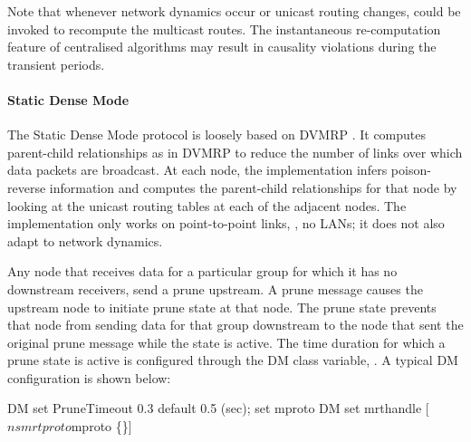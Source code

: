Note that whenever network dynamics occur or unicast routing changes,
 could be invoked to recompute the multicast routes.
The instantaneous re-computation feature of centralised algorithms
may result in causality violations during the transient
periods.

\paragraph{Static Dense Mode}
The Static Dense Mode protocol is loosely based on DVMRP \cite{rfc1075}.
It computes parent-child relationships as in DVMRP
to reduce the number of links over which data packets are broadcast.
At each node,
the implementation
 infers poison-reverse information
and
 computes the parent-child relationships 
 for that node by looking
at the unicast routing tables at each of the adjacent nodes.
The implementation only works on point-to-point links, \ie, no LANs;
it does not also adapt to network dynamics.

Any node that receives data for a particular group for which
it has no downstream receivers, send a prune upstream.
A prune message causes the upstream node to initiate prune state 
at that node.
The prune state prevents that node from sending data for that group
downstream to the node that sent the original prune message
while the state is active.
The time duration for which a prune state is active is
configured through the DM class variable, .
A typical DM configuration is shown below:
\begin{program}
        DM set PruneTimeout 0.3           \; default 0.5 (sec);
        set mproto DM
        set mrthandle [$ns mrtproto $mproto \{\}]
\end{program}

